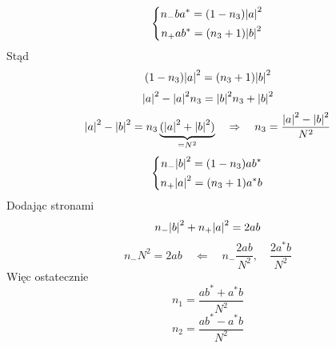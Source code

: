 \documentclass[a4paper,12pt]{article}
\begin{document}
\begin{equation*}
  \left\{\begin{gathered}
      n_{-} b a^* = (1-n_3)\abs{a}^2  \\
      n_{+} a b^*=  (n_3 +1) \abs{b}^2 
  \end{gathered}\right.
\end{equation*}
Stąd
\begin{equation*}
  (1-n_3)\abs{a}^2 =(n_3 +1) \abs{b}^2  
\end{equation*}
\begin{equation*}
  \abs{a}^2 - \abs{a}^2n_3 = \abs{b}^2n_3 + \abs{b}^2
\end{equation*}
\begin{equation*}
  \abs{a}^2 - \abs{b}^2 = n_3 \underbrace{(\abs{a}^2 + \abs{b}^2)}_{=N^2} \quad
  \Rightarrow \quad n_3 = \frac{\abs{a}^2 - \abs{b}^2 }{N^2}
\end{equation*}
\begin{equation*}
  \left\{\begin{gathered}
      n_{-} \abs{b}^2 = (1-n_3)ab^*  \\
      n_{+} \abs{a}^2=  (n_3 +1)a^*b
  \end{gathered}\right.
\end{equation*}
Dodając stronami
\begin{equation*}
  n_{-} \abs{b}^2 + n_{+} \abs{a}^2= 2ab
\end{equation*}
\begin{equation*}
  n_{-} N^2 = 2ab \quad \Leftarrow \quad n_{-} \frac{2ab}{N^2}, \quad
  \frac{2a^*b}{N^2}
\end{equation*}
Więc ostatecznie
\begin{equation*}
  n_1 = \frac{ab^* + a^*b}{N^2}
\end{equation*}
\begin{equation*}
  n_2 = \frac{ab^* - a^*b}{N^2}
\end{equation*}
\end{document}
